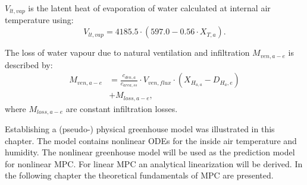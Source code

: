 $V_{lt,vap}$ is the latent heat of evaporation of water calculated at internal air temperature using:
\begin{equation}\label{eq:vltvap}
V_{lt,vap} = 4185.5 \cdot \left(597.0 - 0.56 \cdot X_{T,a}\right).
\end{equation}

The loss of water vapour due to natural ventilation and infiltration $M_{ven,a-e}$ is described by:
\begin{equation}\label{eq:mven}
\begin{split}
M_{ven,a-e} &= \frac{c_{den,a}}{c_{area,ss}} \cdot V_{ven,flux} \cdot \left(X_{H_{a,a}}-D_{H_a,e}\right) \\
            &+ M_{loss,a-e},
\end{split}
\end{equation}
where $M_{loss,a-e}$ are constant infiltration losses.\par\medskip

Establishing a (pseudo-) physical greenhouse model was illustrated in this chapter.
The model contains nonlinear ODEs for the inside air temperature and humidity. 
The nonlinear greenhouse model will be used as the prediction model for nonlinear MPC.
For linear MPC an analytical linearization will be derived.
In the following chapter the theoretical fundamentals of MPC are presented.